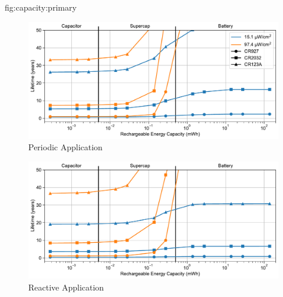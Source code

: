 \begin{definefigure}{fig:capacity:primary}
  \centering
  \begin{subfigure}{\columnwidth}
    \centering
    \includegraphics[width=\linewidth]{figs/capacity/primary/sense_and_send_life_vs_sec_size}
    \caption{Periodic Application}
    \label{fig:primary:sensesec}
  \end{subfigure}
  \begin{subfigure}{\columnwidth}
    \centering
    \includegraphics[width=\linewidth]{figs/capacity/primary/door_occu_life_vs_sec_size}
      \caption{Reactive Application}
    \label{fig:primary:eventsec}
  \end{subfigure}
  \caption{
    \normalfont
    Estimated lifetime
    when varying secondary energy capacity for different harvesting scenarios
    and backup energy storage sizes. 
    The periodic application's period
    is 30\,s and the reactive application events are scaled to
    represent a maximum of 2000 events per hour during the peak hour.
    The backup
    sizes correspond to those found in common coin cell batteries:
    90\,mWh, 720\,mWh, 4500\,mWh for the CR927, CR2032, and CR123A respectively.
    As the ability to capture
    more harvested energy increases, the sensors lifetime increases.
    In some scenarios, expected
    lifetime becomes unbounded as the device is able to subsist entirely on harvested
    energy.
    }
\end{definefigure}

